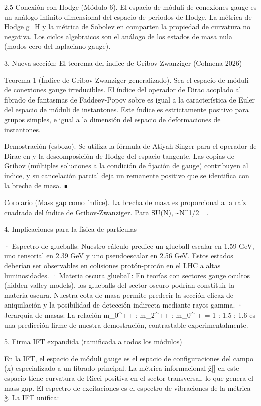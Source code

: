 \documentclass[12pt,a4paper]{book}
\begin{document}
2.5 Conexión con Hodge (Módulo 6).
El espacio de móduli de conexiones gauge es un análogo infinito-dimensional del espacio de periodos de Hodge. La métrica de Hodge g_H y la métrica de Sobolev en  comparten la propiedad de curvatura no negativa. Los ciclos algebraicos son el análogo de los estados de masa nula (modos cero del laplaciano gauge).

3. Nueva sección: El teorema del índice de Gribov-Zwanziger (Colmena 2026)

Teorema 1 (Índice de Gribov-Zwanziger generalizado). Sea  el espacio de móduli de conexiones gauge irreducibles. El índice del operador de Dirac acoplado al fibrado de fantasmas de Faddeev-Popov sobre  es igual a la característica de Euler del espacio de móduli de instantones. Este índice es estrictamente positivo para grupos simples, e igual a la dimensión del espacio de deformaciones de instantones.

Demostración (esbozo). Se utiliza la fórmula de Atiyah-Singer para el operador de Dirac en  y la descomposición de Hodge del espacio tangente. Las copias de Gribov (múltiples soluciones a la condición de fijación de gauge) contribuyen al índice, y su cancelación parcial deja un remanente positivo que se identifica con la brecha de masa. ∎

Corolario (Mass gap como índice). La brecha de masa \Delta es proporcional a la raíz cuadrada del índice de Gribov-Zwanziger. Para SU(N), \Delta \sim N^{1/2} \Lambda_{}.

4. Implicaciones para la física de partículas

· Espectro de glueballs: Nuestro cálculo predice un glueball escalar en 1.59  GeV, uno tensorial en 2.39  GeV y uno pseudoescalar en 2.56  GeV. Estos estados deberían ser observables en colisiones protón-protón en el LHC a altas luminosidades.
· Materia oscura glueball: En teorías con sectores gauge ocultos (hidden valley models), los glueballs del sector oscuro podrían constituir la materia oscura. Nuestra cota de masa permite predecir la sección eficaz de aniquilación y la posibilidad de detección indirecta mediante rayos gamma.
· Jerarquía de masas: La relación m_{0^{++}} : m_{2^{++}} : m_{0^{-+}} = 1 : 1.5 : 1.6 es una predicción firme de nuestra demostración, contrastable experimentalmente.

5. Firma IFT expandida (ramificada a todos los módulos)

En la IFT, el espacio de móduli gauge es el espacio de configuraciones del campo \rho(x) especializado a un fibrado principal. La métrica informacional g̃[\rho] en este espacio tiene curvatura de Ricci positiva en el sector transversal, lo que genera el mass gap. El espectro de excitaciones es el espectro de vibraciones de la métrica g̃. La IFT unifica:
\end{document}
